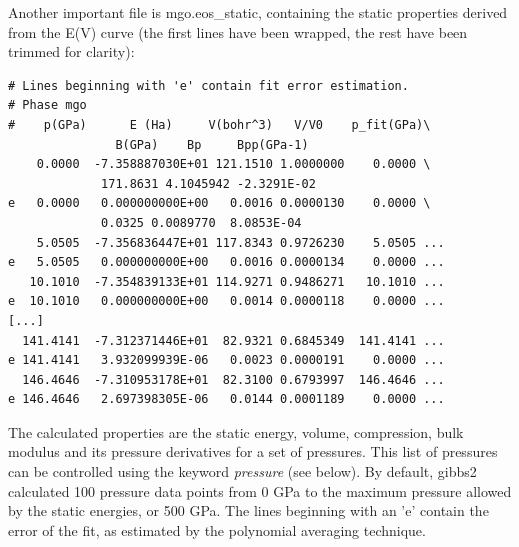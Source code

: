 \documentclass[a4paper]{article}
\begin{document}
Another important file is mgo.eos\_static, containing the static
properties derived from the E(V) curve (the first lines have been
wrapped, the rest have been trimmed for clarity):
%
\asciilist
\begin{lstlisting}
# Lines beginning with 'e' contain fit error estimation.
# Phase mgo
#    p(GPa)      E (Ha)     V(bohr^3)   V/V0    p_fit(GPa)\
               B(GPa)    Bp     Bpp(GPa-1)
    0.0000  -7.358887030E+01 121.1510 1.0000000    0.0000 \
             171.8631 4.1045942 -2.3291E-02
e   0.0000   0.000000000E+00   0.0016 0.0000130    0.0000 \
             0.0325 0.0089770  8.0853E-04
    5.0505  -7.356836447E+01 117.8343 0.9726230    5.0505 ...
e   5.0505   0.000000000E+00   0.0016 0.0000134    0.0000 ...
   10.1010  -7.354839133E+01 114.9271 0.9486271   10.1010 ...
e  10.1010   0.000000000E+00   0.0014 0.0000118    0.0000 ...
[...]
  141.4141  -7.312371446E+01  82.9321 0.6845349  141.4141 ...
e 141.4141   3.932099939E-06   0.0023 0.0000191    0.0000 ...
  146.4646  -7.310953178E+01  82.3100 0.6793997  146.4646 ...
e 146.4646   2.697398305E-06   0.0144 0.0001189    0.0000 ...
\end{lstlisting}

The calculated properties are the static energy, volume, compression,
bulk modulus and its pressure derivatives for a set of pressures. This
list of pressures can be controlled using the keyword \emph{pressure} (see
below). By default, gibbs2 calculated 100 pressure data points from 0
GPa to the maximum pressure allowed by the static energies, or 500
GPa. The lines beginning with an 'e' contain the error of the fit, as
estimated by the polynomial averaging technique.
\end{document}
